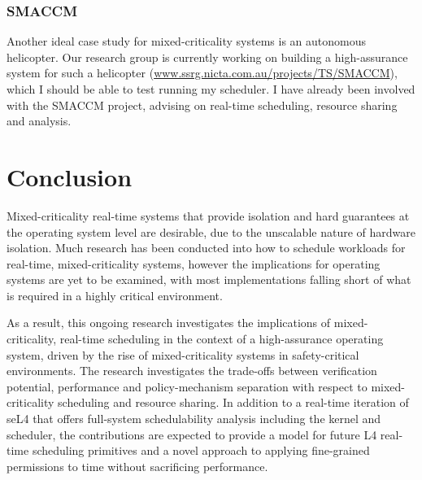 \subsubsection{SMACCM}

Another ideal case study for mixed-criticality systems is an autonomous helicopter.
Our research group is currently working on building a high-assurance system for such a helicopter (\url{www.ssrg.nicta.com.au/projects/TS/SMACCM}), which I should be able to test running my scheduler.
I have already been involved with the SMACCM project, advising on real-time scheduling, resource sharing and analysis.

\section{Conclusion}

Mixed-criticality real-time systems that provide isolation and hard guarantees at the operating system level are desirable, due to the unscalable nature of hardware isolation.
Much research has been conducted into how to schedule workloads for real-time, mixed-criticality systems, however the implications for operating systems are yet to be examined, with most implementations falling short of what is required in a highly critical environment.

As a result, this ongoing research investigates the implications of mixed-criticality, real-time scheduling in the context of a high-assurance operating system, driven by the rise of mixed-criticality systems in safety-critical environments.
The research investigates the trade-offs between verification potential, performance and policy-mechanism separation with respect to mixed-criticality scheduling and resource sharing.
In addition to a real-time iteration of seL4 that offers full-system schedulability analysis including the kernel and scheduler, the contributions are expected to provide a model for future L4 real-time scheduling primitives and a novel approach to applying fine-grained permissions to time without sacrificing performance.


